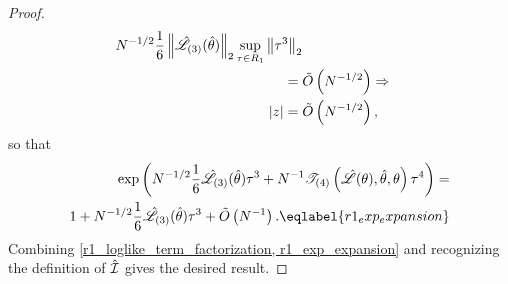 \begin{lem}
\begin{proof}
\begin{align*}
N^{-1/2} \frac{1}{6} \norm{\likhatk{3}(\thetahat)}_2
    \sup_{\tau \in R_1}\norm{\tau^3}_2\\
={}& \ordlog{N^{-1/2}} \Rightarrow\\
|z| ={}& \ordlog{N^{-1/2}},
%
\end{align*}
%
so that
%
\begin{align}
%
\exp\left(
        N^{-1/2} \frac{1}{6} \likhatk{3}(\thetahat) \tau^3 +
        N^{-1} \tresid{4}{\likhat(\theta), \thetahat, \theta} \tau^4
    \right) = \nonumber\\
1 + N^{-1/2} \frac{1}{6} \likhatk{3}(\thetahat) \tau^3 +
    \ordlog{N^{-1}}
. \eqlabel{r1_exp_expansion}
%
\end{align}
%
Combining \eqref{r1_loglike_term_factorization, r1_exp_expansion} and
recognizing the definition of $\hat{\mathcal{I}}$ gives the desired result.
%
\end{proof}
%
\end{lem}



